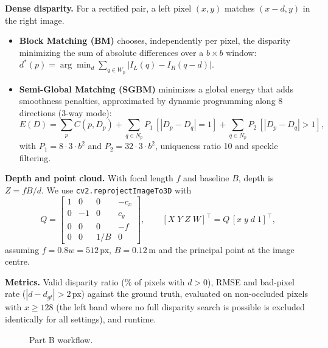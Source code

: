 \documentclass[a4paper,12pt]{article}
\begin{document}
\textbf{Dense disparity.} For a rectified pair, a left pixel $(x,y)$ matches $(x-d,y)$ in the
right image.
\begin{itemize}[leftmargin=*]
    \item \textbf{Block Matching (BM)} chooses, independently per pixel, the disparity minimizing the
          sum of absolute differences over a $b\times b$ window:
          $d^*(p)=\arg\min_d\sum_{q\in W_p}|I_L(q)-I_R(q-d)|$.
    \item \textbf{Semi-Global Matching (SGBM)} minimizes a global energy that adds smoothness
          penalties, approximated by dynamic programming along 8 directions (3-way mode):
          \begin{equation}
              E(D)=\sum_p C(p,D_p) + \sum_{q\in N_p} P_1\,[|D_p-D_q|=1] + \sum_{q\in N_p} P_2\,[|D_p-D_q|>1],
          \end{equation}
          with $P_1=8\cdot3\cdot b^2$ and $P_2=32\cdot3\cdot b^2$, uniqueness ratio 10 and speckle filtering.
\end{itemize}

\textbf{Depth and point cloud.} With focal length $f$ and baseline $B$, depth is
$Z = fB/d$. We use \texttt{cv2.reprojectImageTo3D} with
\begin{equation}
    Q=\begin{bmatrix}1&0&0&-c_x\\0&-1&0&c_y\\0&0&0&-f\\0&0&1/B&0\end{bmatrix},\qquad
    [X\;Y\;Z\;W]^\top = Q\,[x\;y\;d\;1]^\top,
\end{equation}
assuming $f=0.8w=512$\,px, $B=0.12$\,m and the principal point at the image centre.

\textbf{Metrics.} Valid disparity ratio (\% of pixels with $d>0$), RMSE and bad-pixel rate
($|d-d_{gt}|>2$\,px) against the ground truth, evaluated on non-occluded pixels with $x\ge128$
(the left band where no full disparity search is possible is excluded identically for all
settings), and runtime.

\begin{figure}[H]
\centering
{}
\caption{Part B workflow.}
\end{figure}
\end{document}
